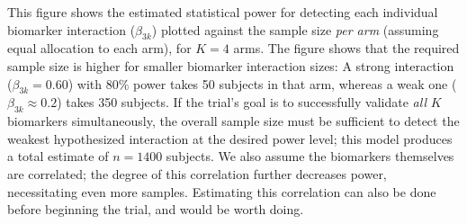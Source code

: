 \documentclass[11pt]{article}
\begin{document}
This figure shows the estimated statistical power for detecting each individual biomarker interaction (\(\beta_{3k}\)) plotted against the sample size {\it per arm} (assuming equal allocation to each arm), for $K=4$ arms. The figure shows that the required sample size is higher for smaller biomarker interaction sizes: A strong interaction (\(\beta_{3k}=0.60\)) with 80\% power takes 50 subjects in that arm, whereas a weak one (\(\beta_{3k} \approx 0.2\)) takes 350 subjects. If the trial's goal is to successfully validate \emph{all} $K$ biomarkers simultaneously, the overall sample size must be sufficient to detect the weakest hypothesized interaction at the desired power level; this model produces a total estimate of $n=1400$ subjects. We also assume the biomarkers themselves are correlated; the degree of this correlation further decreases power, necessitating even more samples. Estimating this correlation can also be done before beginning the trial, and would be worth doing.
\end{document}
